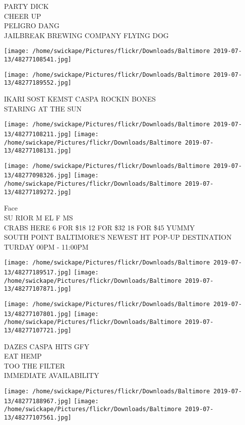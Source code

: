\documentclass[10pt,letterpaper]{article}
\begin{document}
PARTY DICK\\
CHEER UP\\
PELIGRO DANG\\
JAILBREAK BREWING COMPANY FLYING DOG
\pagebreak

\texttt{[image: /home/swickape/Pictures/flickr/Downloads/Baltimore 2019-07-13/48277108541.jpg]}

\vspace{0.25in}
\texttt{[image: /home/swickape/Pictures/flickr/Downloads/Baltimore 2019-07-13/48277189552.jpg]}

IKARI SOST KEMST CASPA ROCKIN BONES\\
STARING AT THE SUN
\pagebreak

\texttt{[image: /home/swickape/Pictures/flickr/Downloads/Baltimore 2019-07-13/48277108211.jpg]}
\texttt{[image: /home/swickape/Pictures/flickr/Downloads/Baltimore 2019-07-13/48277108131.jpg]}

\texttt{[image: /home/swickape/Pictures/flickr/Downloads/Baltimore 2019-07-13/48277098326.jpg]}
\texttt{[image: /home/swickape/Pictures/flickr/Downloads/Baltimore 2019-07-13/48277189272.jpg]}

Face\\
SU RIOR M EL F MS\\
CRABS HERE 6 FOR \$18 12 FOR \$32 18 FOR \$45 YUMMY\\
SOUTH POINT BALTIMORE'S NEWEST HT POP{-}UP DESTINATION TURDAY 00PM {-} 11:00PM
\pagebreak

\texttt{[image: /home/swickape/Pictures/flickr/Downloads/Baltimore 2019-07-13/48277189517.jpg]}
\texttt{[image: /home/swickape/Pictures/flickr/Downloads/Baltimore 2019-07-13/48277107871.jpg]}

\texttt{[image: /home/swickape/Pictures/flickr/Downloads/Baltimore 2019-07-13/48277107801.jpg]}
\texttt{[image: /home/swickape/Pictures/flickr/Downloads/Baltimore 2019-07-13/48277107721.jpg]}

DAZES CASPA HITS GFY\\
EAT HEMP\\
TOO THE FILTER\\
IMMEDIATE AVAILABILITY
\pagebreak

\texttt{[image: /home/swickape/Pictures/flickr/Downloads/Baltimore 2019-07-13/48277188967.jpg]}
\texttt{[image: /home/swickape/Pictures/flickr/Downloads/Baltimore 2019-07-13/48277107561.jpg]}
\end{document}
